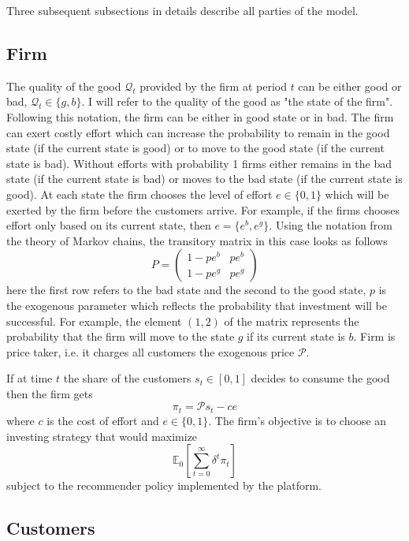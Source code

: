\documentclass[a4paper]{article}
\newcommand{\expect}{\mathbb{E}}
\begin{document}
	
	
	Three subsequent subsections in details describe all parties of the model.
	\subsection{Firm}
	The quality of the good $\mathcal{Q}_t$ provided by the firm at period $t$ can be either good or bad, $\mathcal{Q}_t \in \{g, b\}$. I will refer to the quality of the good as "the state of the firm". Following this notation, the firm can be either in good state or in bad. The firm can exert costly effort which can increase the probability to remain in the good state (if the current state is good) or to move to the good state (if the current state is bad). Without efforts with probability 1 firms either remains in the bad state (if the current state is bad) or moves to the bad state (if the current state is good). At each state the firm chooses the level of effort $e\in\{0, 1\}$ which will be exerted by the firm before the customers arrive. For example, if the firms chooses effort only based on its current state, then $e = \{e^b, e^g\}$. Using the notation from the theory of Markov chains, the transitory matrix in this case looks as follows $$P = \begin{pmatrix}
	1 - pe^{b} & pe^{b}\\
	1-pe^{g} & pe^{g}
	\end{pmatrix}$$
	here the first row refers to the bad state and the second to the good state, $p$ is the exogenous parameter which reflects the probability that investment will be successful. For example, the element $(1, 2)$ of the matrix represents the probability that the firm will move to the state $g$ if its current state is $b$. Firm is price taker, i.e. it charges all customers the exogenous price $\mathcal{P}$.
	
	
	
	If at time $t$ the share of the customers $s_t \in [0, 1]$ decides to consume the good then the firm gets $$\pi_t = \mathcal{P} s_t - ce$$ where $c$ is the cost of effort and $e \in \{0, 1\}$. The firm's objective is to choose an investing strategy that would maximize $$\expect_0\left[\sum_{t=0}^{\infty} \delta^t \pi_t \right]$$ subject to the recommender policy implemented by the platform.
	\subsection{Customers}
	
\end{document}
